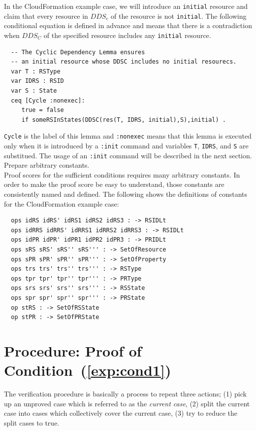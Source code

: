 \documentclass[12pt]{report}
\begin{document}
In the CloudFormation example case, we will introduce an {\tt initial}
resource and claim that every resource in $DDS_c$ of the resource is
not {\tt initial}. The following conditional equation is defined in
advance and means that there is a contradiction when $DDS_C$ of the
specified resource includes any {\tt initial} resource.
\small
\begin{verbatim}
  -- The Cyclic Dependency Lemma ensures
  -- an initial resource whose DDSC includes no initial resourecs.
  var T : RSType
  var IDRS : RSID
  var S : State
  ceq [Cycle :nonexec]: 
     true = false
     if someRSInStates(DDSC(res(T, IDRS, initial),S),initial) .
\end{verbatim}
\normalsize
{\tt Cycle} is the label of this lemma and {\tt :nonexec} means that
this lemma is executed only when it is introduced by a {\tt :init}
command and variables {\tt T}, {\tt IDRS}, and {\tt S} are
substitued. The usage of an {\tt :init} command will be described in
the next section.\\

 Prepare arbitrary constants. \\
Proof scores for the sufficient conditions requires many arbitrary constants.
In order to make the proof score be easy to understand, those constants
are consistently named and defined. The following shows the definitions
of constants for the CloudFormation example case:
\small
\begin{verbatim}
  ops idRS idRS' idRS1 idRS2 idRS3 : -> RSIDLt
  ops idRRS idRRS' idRRS1 idRRS2 idRRS3 : -> RSIDLt
  ops idPR idPR' idPR1 idPR2 idPR3 : -> PRIDLt
  ops sRS sRS' sRS'' sRS''' : -> SetOfResource
  ops sPR sPR' sPR'' sPR''' : -> SetOfProperty
  ops trs trs' trs'' trs''' : -> RSType
  ops tpr tpr' tpr'' tpr''' : -> PRType
  ops srs srs' srs'' srs''' : -> RSState
  ops spr spr' spr'' spr''' : -> PRState
  op stRS : -> SetOfRSState
  op stPR : -> SetOfPRState
\end{verbatim}
\normalsize
\section{Procedure: Proof of Condition~(\ref{exp:cond1})}
\label{sec:initcont}
The verification procedure is basically a process to repeat three
actions; (1) pick up an unproved case which is referred to as the
{\it current case}, (2) split the current case into cases which
collectively cover the current case, (3) try to reduce the split cases
to true.
\end{document}
